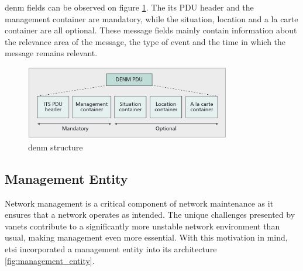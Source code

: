 \gls{denm} fields can be observed on figure \ref{fig:denm_structure}. The \gls{its} PDU header and the management container are mandatory, while the situation, location and a la carte container are all optional. These message fields mainly contain information about the relevance area of the message, the type of event and the time in which the message remains relevant.\cite{al-sultan_comprehensive_2014}

\begin{figure}[htbp]
    \centering
    \includegraphics[width=0.8\textwidth]{Chapters/Figures/VANETs/denm_structure.png}
   	\caption{\gls{denm} structure~\cite{festag_cooperative_2014}}
   	\label{fig:denm_structure}
\end{figure}



\subsection[Management Entity]{Management Entity}
\label{subsec:Security_of_VANETs}
Network management is a critical component of network maintenance as it ensures that a network operates as intended. The unique challenges presented by \glspl{vanet} contribute to a significantly more unstable network environment than usual, making management even more essential. With this motivation in mind, \gls{etsi} incorporated a management entity into its architecture \ref{fig:management_entity}.

